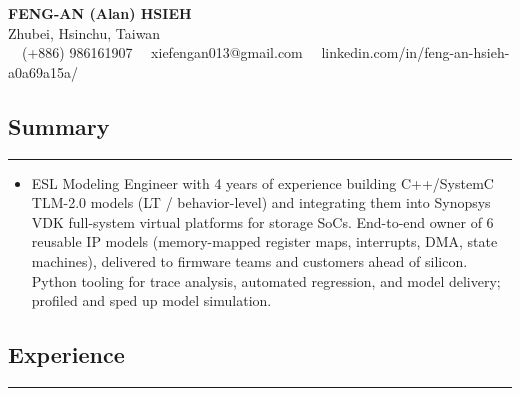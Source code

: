 \documentclass[11pt,a4paper]{article}
\begin{document}
\begin{center}
	{\LARGE \textbf{FENG-AN (Alan) HSIEH}}\\
	Zhubei, Hsinchu, Taiwan
	\vspace{0.05cm}
	\\
	\raisebox{-0.2\height}{\Large \faPhoneSquare} \ \ (+886) 986161907 
    \raisebox{-0.2\height}{\Large \faEnvelopeSquare} \ \ xiefengan013@gmail.com 
    \raisebox{-0.2\height}{\Large \faLinkedinSquare} \ \ linkedin.com/in/feng-an-hsieh-a0a69a15a/
\end{center}

\subsection*{\large Summary}
\hrule
\vspace{0.3em}

\begin{itemize}[leftmargin=1em,noitemsep]
	\item[]
    ESL Modeling Engineer with 4 years of experience building C++/SystemC TLM-2.0 models (LT / behavior-level) and integrating them into Synopsys VDK full-system virtual platforms for storage SoCs. End-to-end owner of 6 reusable IP models (memory-mapped register maps, interrupts, DMA, state machines), delivered to firmware teams and customers ahead of silicon. Python tooling for trace analysis, automated regression, and model delivery; profiled and sped up model simulation.
\end{itemize}

\subsection*{\large Experience}
\hrule
\vspace{0.3em}
\end{document}
